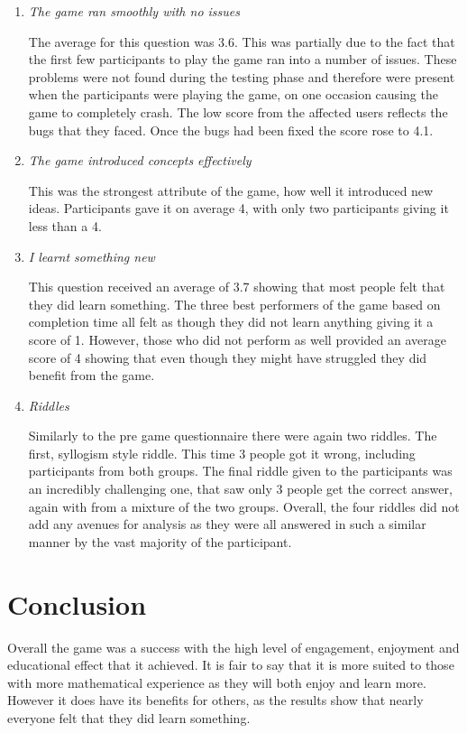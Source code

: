 \documentclass[12pt,a4paper]{report}
\begin{document}
\begin{enumerate}
	\item  \textit {The game ran smoothly with no issues}
	
	The average for this question was 3.6. This was partially due to the fact that the first few participants to play the game ran into a number of issues. These problems were not found during the testing phase and therefore were present when the participants were playing the game, on one occasion causing the game to completely crash. The low score from the affected users reflects the bugs that they faced. Once the bugs had been fixed the score rose to 4.1.
	
	\item  \textit {The game introduced concepts effectively}
	
	This was the strongest attribute of the game, how well it introduced new ideas. Participants gave it on average 4, with only two participants giving it less than a 4.
	
	\item  \textit {I learnt something new}
	
	This question received an average of 3.7 showing that most people felt that they did learn something. The three best performers of the game based on completion time all felt as though they did not learn anything giving it a score of 1. However, those who did not perform as well provided an average score of 4 showing that even though they might have struggled they did benefit from the game.
	
	\item  \textit {Riddles}
	
	Similarly to the pre game questionnaire there were again two riddles. The first, syllogism style riddle. This time 3 people got it wrong, including participants from both groups. The final riddle given to the participants was an incredibly challenging one, that saw only 3 people get the correct answer, again with from a mixture of the two groups. Overall, the four riddles did not add any avenues for analysis as they were all answered in such a similar manner by the vast majority of the participant.
	
\end{enumerate}

\chapter{Conclusion}

Overall the game was a success with the high level of engagement, enjoyment and educational effect that it achieved. It is fair to say that it is more suited to those with more mathematical experience as they will both enjoy and learn more. However it does have its benefits for others, as the results show that nearly everyone felt that they did learn something. 
\end{document}
